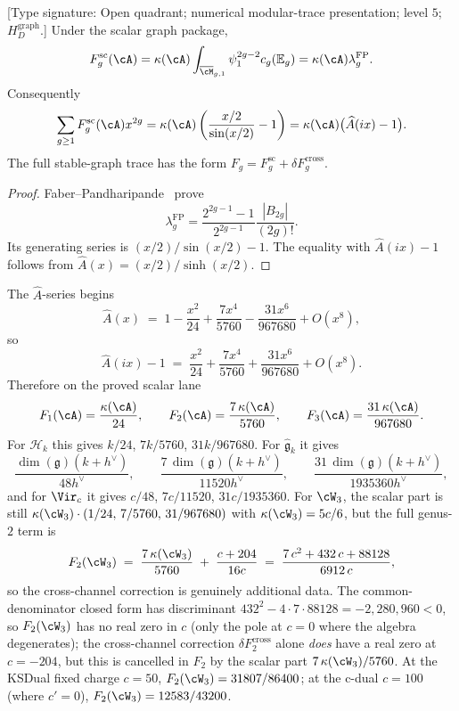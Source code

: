 \begin{theorem}
\label{prop:grr-bridge}
\textup{[Type signature: Open quadrant; numerical modular-trace
presentation; level $5$; $H_D^{\mathrm{graph}}$.]}
Under the scalar graph package,
\begin{equation}
 F_g^{\mathrm{sc}}(\cA)
 =\kappa(\cA)
 \int_{\overline{\cM}_{g,1}}\psi_1^{2g-2}c_g(\mathbb E_g)
 =\kappa(\cA)\lambda_g^{\mathrm{FP}}.
 \label{eq:grr-bridge}
\end{equation}
Consequently
\begin{equation}
 \sum_{g\ge1}F_g^{\mathrm{sc}}(\cA)x^{2g}
 =\kappa(\cA)\left(\frac{x/2}{\sin(x/2)}-1\right)
 =\kappa(\cA)\bigl(\widehat A(ix)-1\bigr).
 \label{eq:grr-bridge-total}
\end{equation}
The full stable-graph trace has the form
$F_g=F_g^{\mathrm{sc}}+\delta F_g^{\mathrm{cross}}$.
\end{theorem}

\begin{proof}
Faber--Pandharipande~\cite{FP03} prove
\[
 \lambda_g^{\mathrm{FP}}
 =\frac{2^{2g-1}-1}{2^{2g-1}}
 \frac{|B_{2g}|}{(2g)!}.
\]
Its generating series is $(x/2)/\sin(x/2)-1$.  The equality with
$\widehat A(ix)-1$ follows from
$\widehat A(x)=(x/2)/\sinh(x/2)$.
\end{proof}


\begin{example}
\label{ex:first-three-scalar-genera}
The $\widehat{A}$-series begins
\[
\widehat{A}(x)
\;=\;
1-\frac{x^2}{24}+\frac{7x^4}{5760}-\frac{31x^6}{967680}+O(x^8),
\]
so
\[
\widehat{A}(ix)-1
\;=\;
\frac{x^2}{24}+\frac{7x^4}{5760}+\frac{31x^6}{967680}+O(x^8).
\]
Therefore on the proved scalar lane
\[
F_1(\cA)=\frac{\kappa(\cA)}{24},
\qquad
F_2(\cA)=\frac{7\,\kappa(\cA)}{5760},
\qquad
F_3(\cA)=\frac{31\,\kappa(\cA)}{967680}.
\]
For $\mathcal{H}_k$ this gives
$k/24$, $7k/5760$, $31k/967680$.
For $\widehat{\mathfrak{g}}_k$ it gives
\[
\frac{\dim(\mathfrak{g})(k+h^\vee)}{48h^\vee},
\qquad
\frac{7\,\dim(\mathfrak{g})(k+h^\vee)}{11520h^\vee},
\qquad
\frac{31\,\dim(\mathfrak{g})(k+h^\vee)}{1935360h^\vee},
\]
and for $\Vir_c$ it gives
$c/48$, $7c/11520$, $31c/1935360$.
For $\cW_3$, the scalar part is still
$\kappa(\cW_3)\cdot(1/24,\,7/5760,\,31/967680)$ with
$\kappa(\cW_3)=5c/6$, but the full genus-$2$ term is
\[
F_2(\cW_3)
\;=\;
\frac{7\,\kappa(\cW_3)}{5760}
\;+\;
\frac{c+204}{16c}
\;=\;
\frac{7\,c^{2}+432\,c+88128}{6912\,c},
\]
so the cross-channel correction is genuinely additional data. The
common-denominator closed form has discriminant $432^{2}-4\cdot 7\cdot
88128 = -2{,}280{,}960<0$, so $F_2(\cW_3)$ has no real zero in $c$
\textup{(}only the pole at $c=0$ where the algebra degenerates\textup{);}
the cross-channel correction $\delta F_2^{\mathrm{cross}}$ alone
\emph{does} have a real zero at $c=-204$, but this is cancelled in
$F_2$ by the scalar part $7\,\kappa(\cW_3)/5760$. At the KSDual fixed
charge $c=50$, $F_2(\cW_3)=31807/86400$; at the c-dual $c=100$
\textup{(}where $c'=0$\textup{),} $F_2(\cW_3)=12583/43200$.
\end{example}

